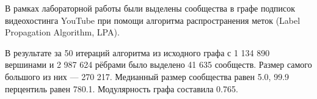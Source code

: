 
В рамках лабораторной работы были выделены сообщества в графе подписок видеохостинга YouTube при помощи алгоритма распространения меток (Label Propagation Algorithm, LPA).

В результате за 50 итераций алгоритма из исходного графа с 1 134 890 вершинами и 2 987 624 рёбрами было выделено 41 635 сообществ. Размер самого большого из них --- 270 217. Медианный размер сообщества равен 5.0, 99.9 перцентиль равен 780.1. Модулярность графа составила 0.765.

